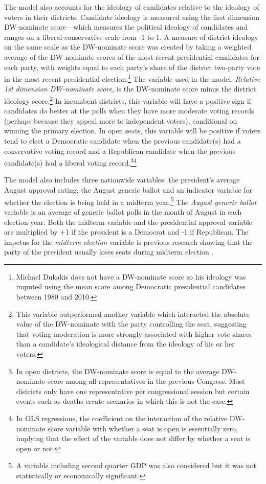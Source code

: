 \documentclass[12pt,final,fleqn]{article}
\theoremstyle{plain}
\begin{document}
The model also accounts for the ideology of candidates relative to the ideology of voters in their districts. Candidate ideology is measured using the first dimension DW-nominate score---which measures the political ideology of candidates and ranges on a liberal-conservative scale from -1 to 1. A measure of district ideology on the same scale as the DW-nominate score was created by taking a weighted average of the DW-nominate scores of the most recent presidential candidates for each party, with weights equal to each party's share of the district two-party vote in the most recent presidential election.\footnote{Michael Dukakis does not have a DW-nominate score so his ideology was imputed using the mean score among Democratic presidential candidates between 1980 and 2010.} The variable used in the model, \emph{Relative 1st dimension DW-nominate score}, is the DW-nominate score minus the district ideology score.\footnote{This variable outperformed another variable which interacted the absolute value of the DW-nominate with the party controlling the seat, suggesting that voting moderation is more strongly associated with higher vote shares than a candidate's ideological distance from the ideology of his or her voters.} In incumbent districts, this variable will have a positive sign if candidates do better at the polls when they have more moderate voting records (perhaps because they appeal more to independent voters), conditional on winning the primary election. In open seats, this variable will be positive if voters tend to elect a Democratic candidate when the previous candidate(s) had a conservative voting record and a Republican candidate when the previous candidate(s) had a liberal voting record.\footnote{In open districts, the DW-nominate score is equal to the average DW-nominate score among all representatives in the previous Congress. Most districts only have one representative per congressional session but certain events such as deaths create scenarios in which this is not the case.}\footnote{In OLS regressions, the coefficient on the interaction of the relative DW-nominate score variable with whether a seat is open is essentially zero, implying that the effect of the variable does not differ by whether a seat is open or not.}

The model also includes three nationwide variables: the president's average August approval rating, the August generic ballot and an indicator variable for whether the election is being held in a midterm year.\footnote{A variable including second quarter GDP was also considered but it was not statistically or economically significant.} The \emph{August generic ballot} variable is an average of generic ballot polls in the month of August in each election year. Both the midterm variable and the presidential approval variable are multiplied by +1 if the president is a Democrat and -1 if Republican. The impetus for the \emph{midterm election} variable is previous research showing that the party of the president usually loses seats during midterm election \citep[e.g.][]{erikson1988puzzle}. 
\end{document}
